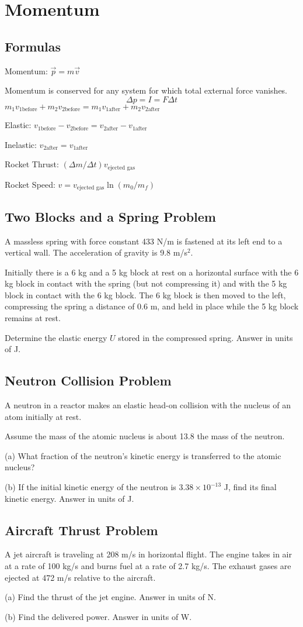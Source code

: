 \documentclass[../physics12.tex]{subfiles}
\begin{document}
\chapter{Momentum}
\section{Formulas}
Momentum: $\vec{p}=m\vec{v}$

Momentum is conserved for any system for which total external force vanishes.
\[ \Delta p = I = F\Delta t \]
$m_1v_{1\text{before}} + m_2v_{2\text{before}}=m_1v_{1\text{after}}+m_2v_{2\text{after}}$

Elastic: $v_{1\text{before}}-v_{2\text{before}}=v_{2\text{after}}-v_{1\text{after}}$

Inelastic: $v_{2\text{after}}=v_{1\text{after}}$

Rocket Thrust: $(\Delta m/\Delta t)v_{\text{ejected gas}}$

Rocket Speed: $v=v_{\text{ejected gas}}\ln(m_0/m_f)$

\section{Two Blocks and a Spring Problem}
A massless spring with force constant 433 N/m is fastened at its left end to a vertical wall.
The acceleration of gravity is 9.8 m/s$^2$.

Initially there is a 6 kg and a 5 kg block at rest on a horizontal surface with the 6 kg block in contact with the spring 
(but not compressing it) and with the 5 kg block in contact with the 6 kg block. The 6 kg block is then moved to the left, compressing the spring 
a distance of 0.6 m, and held in place while the 5 kg block remains at rest.

Determine the elastic energy $U$ stored in the compressed spring.
Answer in units of J.

\section{Neutron Collision Problem}
A neutron in a reactor makes an elastic head-on collision with the nucleus of an atom initially at rest.

Assume the mass of the atomic nucleus is about 13.8 the mass of the neutron.

(a) What fraction of the neutron's kinetic energy is transferred to the atomic nucleus?

(b) If the initial kinetic energy of the neutron is $3.38\times 10^{-13}$ J, find its final kinetic energy.
Answer in units of J.

\section{Aircraft Thrust Problem}
A jet aircraft is traveling at 208 m/s in horizontal flight. The engine takes in air at a rate of 100 kg/s and burns fuel at a rate of 2.7 kg/s.
The exhaust gases are ejected at 472 m/s relative to the aircraft.

(a) Find the thrust of the jet engine.
Answer in units of N.

(b) Find the delivered power.
Answer in units of W.
\end{document}
